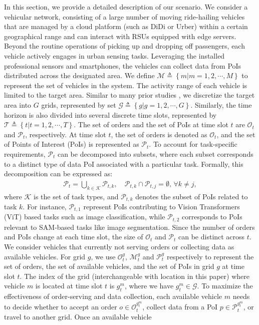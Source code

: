 In this section, we provide a detailed description of our scenario. We consider a vehicular network, consisting of a large number of moving ride-hailing vehicles that are managed by a cloud platform (such as DiDi or Urber) within a certain geographical range and can interact with RSUs equipped with edge servers. Beyond the routine operations of picking up and dropping off passengers, each vehicle actively engages in urban sensing tasks. Leveraging the installed professional sensors and smartphones, the vehicles can collect data from PoIs distributed across the designated area. We define $\mathcal{M} \triangleq \left\{m | m = 1,2,\cdots, M\right\}$ to represent the set of vehicles in the system. The activity range of each vehicle is limited to the target area. Similar to many prior studies \cite{KDD18, KDD22}, we discretize the target area into $G$ grids, represented by set $\mathcal{G} \triangleq \left\{g|g = 1, 2, \cdots, G \right\}$. Similarly, the time horizon is also divided into several discrete time slots, represented by $\mathcal{T} \triangleq \left\{t| t = 1, 2, \cdots, T \right\}$. The set of orders and the set of PoIs at time slot $t$ are $\mathcal{O}_t$ and $\mathcal{P}_t$, respectively. At time slot \( t \), the set of orders is denoted as \( \mathcal{O}_t \), and the set of Points of Interest (PoIs) is represented as \( \mathcal{P}_t \). 
To account for task-specific requirements, \( \mathcal{P}_t \) can be decomposed into subsets, where each subset corresponds to a distinct type of data PoI associated with a particular task. Formally, this decomposition can be expressed as:  
\begin{align}
    \mathcal{P}_t = \bigcup_{k \in \mathcal{K}} \mathcal{P}_{t,k}, \quad \mathcal{P}_{t,k} \cap \mathcal{P}_{t,j} = \emptyset, \, \forall k \neq j,
\end{align}
where \( \mathcal{K} \) is the set of task types, and \( \mathcal{P}_{t,k} \) denotes the subset of PoIs related to task \( k \). For instance, \( \mathcal{P}_{t,1} \) represent PoIs contributing to Vision Transformers (ViT)\cite{dosovitskiy2020image} based tasks such as image classification, while \( \mathcal{P}_{t,2} \) corresponds to PoIs relevant to SAM-based tasks like image segmentation. 
Since the number of orders and PoIs change at each time slot, the size of $\mathcal{O}_t$ and $\mathcal{P}_t$ can be distinct across $t$. We consider vehicles that currently not serving orders or collecting data as available vehicles. For grid $g$, we use $\mathcal{O}_t^g$, $\mathcal{M}_t^g$ and $\mathcal{P}_t^g$ respectively to represent the set of orders, the set of available vehicles, and the set of PoIs in grid $g$ at time slot $t$. The index of the grid (interchangeable with location in this paper) where vehicle $m$ is located at time slot $t$ is $g_t^m$, where we have $g_t^m \in \mathcal{G}$. To maximize the effectiveness of order-serving and data collection, each available vehicle $m$ needs to decide whether to accept an order $o \in \mathcal{O}_t^{g_t^m}$, collect data from a PoI $p \in \mathcal{P}_t^{g_t^m}$, or travel to another grid. Once an available vehicle 
